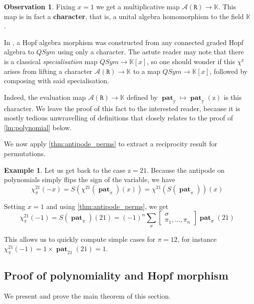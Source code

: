\documentclass[12pt, reqno]{amsart}
\theoremstyle{definition}
\newtheorem{obs}[thm]{Observation}
\newtheorem{smpl}[thm]{Example}
\DeclareMathOperator{\pat}{\mathbf{pat}}
\begin{document}
\begin{obs}
    Fixing $x = 1$ we get a multiplicative map $\mathcal{A}(\mathtt{R}) \to \mathbb{K}$.
    This map is in fact a \textbf{character}, that is, a unital algebra homomorphism to the field $\mathbb{K}$.
    
    In \cite{aguiar2006combinatorial}, a Hopf algebra morphism was constructed from any connected graded Hopf algebra to $QSym$ using only a character.
    The astute reader may note that there is a classical \textit{specialisation} map $QSym \to \mathbb{K}[x]$, so one should wonder if this $\chi^{\mathrm{z}}$ arises from lifting a character $\mathcal{A}(\mathtt{R}) \to \mathbb{K}$ to a map $QSym \to \mathbb{K}[x]$, followed by composing with said specialisation.
    
    Indeed, the evaluation map $\mathcal{A}(\mathtt{R}) \to \mathbb{K}$ defined by $\pat_{\mathrm{y}} \mapsto \pat_{\mathrm{y}}(\mathrm{z})$ is this character.
    We leave the proof of this fact to the interested reader, because it is mostly tedious unwravelling of definitions that closely relates to the proof of \cref{lm:polynomial} below.
\end{obs}

We now apply \cref{thm:antipode_perms} to extract a reciprocity result for permutations.

\begin{smpl}
    Let us get back to the case $\mathrm{z} = 21$.
    Because the antipode on polynomials simply flips the sign of the variable, we have
$$\chi^{21}_{\pi}(-x) = S(\chi^{21}(\pat_{\pi})(x)) =\chi^{21}(S(\pat_{\pi}))(x) $$

Setting $x = 1$ and using \cref{thm:antipode_perms}, we get
$$\chi^{21}_{\pi}(-1) = S(\pat_{\pi})(21) = (-1)^n \sum_{\sigma} 
    \begin{bmatrix}
    \sigma \\ \pi_1, \dots, \pi_n
    \end{bmatrix}\pat_{\sigma}(21) $$

    This allows us to quickly compute simple cases for $\pi = 12$, for instance $\chi^{21}_{\pi}(-1) = 1 \times \pat_{21}(21) = 1$.
\end{smpl}



\subsection{Proof of polynomiality and Hopf morphism}

We present and prove the main theorem of this section.
\end{document}
